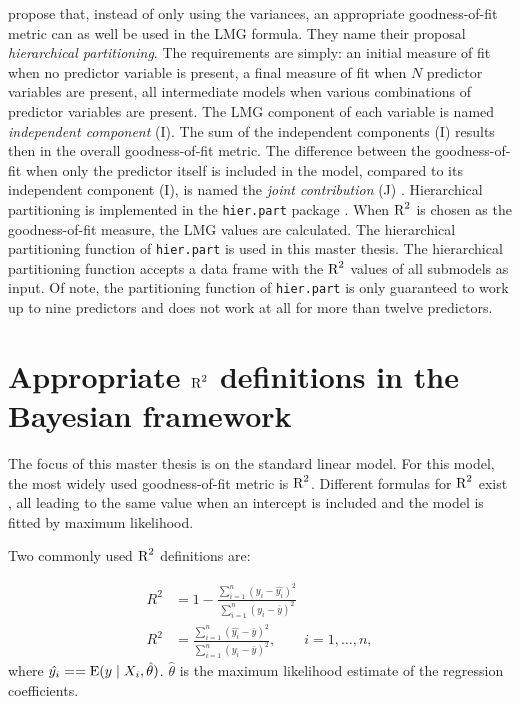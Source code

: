 \documentclass[11pt,a4paper,twoside]{book}\usepackage[]{graphicx}\usepackage[]{color}
\begin{document}
\cite{Chevan1991} propose that, instead of only using the variances, an appropriate goodness-of-fit metric can as well be used in the LMG formula. They name their proposal \textit{hierarchical partitioning}. The requirements are simply: an initial measure of fit when no predictor variable is present, a final measure of fit when $N$ predictor variables are present, all intermediate models when various combinations of predictor variables are present. 
  The LMG component of each variable is named \textit{independent component} (I). The sum of the independent components (I) results then in the overall goodness-of-fit metric. The difference between the goodness-of-fit when only the predictor itself is included in the model, compared to its independent component (I), is named the \textit{joint contribution} (J) \citep{Gromping2015}. Hierarchical partitioning is implemented in the \texttt{hier.part} package \citep{Walsh2015}. When  $\text{R}^2$ is chosen as the goodness-of-fit measure, the LMG values are calculated. The hierarchical partitioning function of \texttt{hier.part} is used in this master thesis. The hierarchical partitioning function accepts a data frame with the $\text{R}^2$ values of all submodels as input. Of note,  the partitioning function of \texttt{hier.part} is only guaranteed to work up to nine predictors and does not work at all for more than twelve predictors.
  
\section{Appropriate $\text{R}^2$ definitions in the Bayesian framework}
The focus of this master thesis is on the standard linear model. For this model, the most widely used goodness-of-fit metric is $\text{R}^2$.  Different formulas for $\text{R}^2$ exist \cite{Kvalseth1985}, all leading to the same value when an intercept is included and the model is fitted by maximum likelihood. 

Two commonly used $\text{R}^2$ definitions are:
   
      \begin{align} 
     R^2 &= 1 - \frac{\sum_{i=1}^{n}(y_{i} - \hat{y_{i}})^2}{\sum_{i=1}^{n}(y_{i}-\bar{y})^2}   \label{eq:rtwo1} \\
     R^2 &= \frac{\sum_{i=1}^{n}(\hat{y_{i}} - \bar{y})^2}{\sum_{i=1}^{n}(y_{i}-\bar{y})^2}, \qquad i = 1,\dots,n,   \label{eq:rtwo2} 
   \end{align} 
where $\hat{y_{i}} = = \operatorname{E} ({y \mid X_{i}, \hat{\theta}})$.  $\hat{\theta}$ is the maximum likelihood estimate of the regression coefficients.
\end{document}
